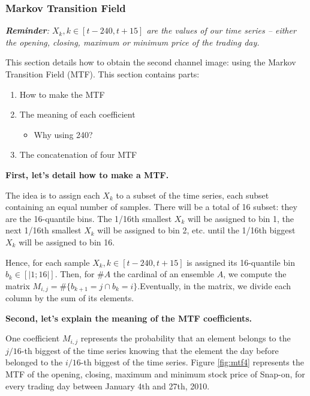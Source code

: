 \documentclass[11pt]{article}
\begin{document}
\begin{onehalfspace}
\subsubsection{Markov Transition Field}
\label{sec:mtf}

\textit{\textbf{Reminder}: $X_k, k \in [t - 240, t+15]$ are the values of our time series -- either the opening, closing, maximum or minimum price of the trading day.}

This section details how to obtain the second channel image: using the Markov Transition Field (MTF). This section contains parts:

\begin{enumerate}
    \item How to make the MTF
    \item The meaning of each coefficient
    \begin{itemize}
        \item Why using 240?
    \end{itemize}
    \item The concatenation of four MTF
\end{enumerate}

\noindent \textbf{First, let's detail how to make a MTF.}

The idea is to assign each $X_k$ to a subset of the time series, each subset containing an equal number of samples. There will be a total of 16 subset: they are the 16-quantile bins. The 1/16th smallest $X_k$ will be assigned to bin 1, the next 1/16th smallest $X_k$ will be assigned to bin 2, etc. until the 1/16th biggest $X_k$ will be assigned to bin 16. 

Hence, for each sample $X_k, k \in [t - 240, t+15]$ is assigned its 16-quantile bin $b_k \in [|1;16|]$. Then, for $\#A$ the cardinal of an ensemble $A$, we compute the matrix $M_{i,j} = \# \{b_{k+1} = j \cap b_k = i \}$.Eventually, in the matrix, we divide each column by the sum of its elements.

\noindent \textbf{Second, let's explain the meaning of the MTF coefficients.}

One coefficient $M_{i,j}$ represents the probability that an element belongs to the $j/16$-th biggest of the time series knowing that the element the day before belonged to the $i/16$-th biggest of the time series. Figure \ref{fig:mtf4} represents the MTF of the opening, closing, maximum and minimum stock price of Snap-on, for every trading day between January 4th and 27th, 2010.



\end{onehalfspace}
\end{document}
